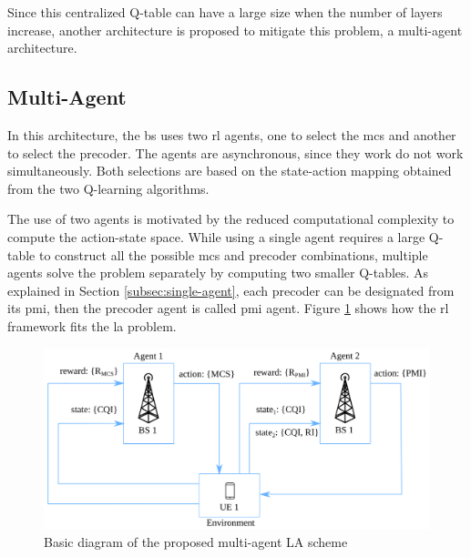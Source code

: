 Since this centralized Q-table can have a large size when the number of layers increase, another architecture is proposed to mitigate this problem, a multi-agent architecture.

\subsection{Multi-Agent}

In this architecture, the \gls{bs} uses two \gls{rl} agents, one to select the \gls{mcs} and another to select the precoder.
%
The agents are asynchronous, since they work do not work simultaneously.
%
Both selections are based on the state-action mapping obtained from the two Q-learning algorithms.


The use of two agents is motivated by the reduced computational complexity to compute the action-state space.
%
While using a single agent requires a large Q-table to construct all the possible \gls{mcs} and precoder combinations, multiple agents solve the problem separately by computing two smaller Q-tables.
%
As explained in Section \ref{subsec:single-agent}, each precoder can be designated from its \gls{pmi}, then the precoder agent is called \gls{pmi} agent.
%
Figure \ref{fig:la-rl-frame} shows how the \gls{rl} framework fits the \gls{la} problem.

%
\begin{figure}[!hb]
	\centerline{\includegraphics[width=\columnwidth]{figures/chp_la/rl-framework-mateus.png}}
	\caption{Basic diagram of the proposed multi-agent LA scheme}
	\label{fig:la-rl-frame}
\end{figure}
%


